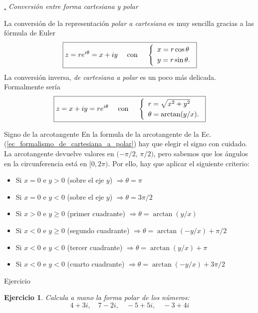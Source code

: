 \documentclass[a4paper,11pt]{book} %
\newtheorem{ejercicio_contador}{Ejercicio}
\newcommand{\Ejercicio}[1]{
		\begin{mybox_gray}{Ejercicio} 
			\begin{ejercicio_contador}
				 #1 
			\end{ejercicio_contador} 
		\end{mybox_gray}
	}
\numberwithin{equation}{chapter}
\def\subsubiContadorIt{\par\addtocounter{subsubsection}{1}\underline{\it\thesubsubsection.}\hskip0.5cm \setcounter{subsubsubsectionIt}{0}}
\newcommand{\SubsubiIt}[1]{
		\subsubiContadorIt \textit{#1}
	}
\newcounter{subsubsubsectionIt}[subsubsection]
\begin{document}
		
			\SubsubiIt{Conversión entre forma cartesiana y polar}

La conversión de la representación \textit{polar a cartesiana} es muy sencilla gracias a las fórmula de Euler
	\begin{equation}
	\boxed{z = r e^{i\theta} = x + i y ~~~\hbox{ con }  ~~~\left\{\begin{array}{l} x=r \cos \theta \\ \rule{0mm}{4mm} y = r\sin \theta . \end{array} \right. }
	\end{equation}
La conversión inversa, \textit{de cartesiana a polar} es un poco más delicada. Formalmente sería
	\begin{equation} \label{ec_formalismo_de_cartesiana_a_polar}
	\boxed{z = x + i y  = r e^{i\theta} ~~~ \hbox{ con } ~~~ \left\{\begin{array}{l} r=\sqrt{x^2+y^2} \\  \rule{0mm}{4mm} \theta = \arctan(y/x) . \end{array} \right.} 
	\end{equation}

	\begin{mybox_blue}{Signo de la arcotangente}
	En la formula de la arcotangente de la Ec. (\ref{ec_formalismo_de_cartesiana_a_polar}) hay que elegir el signo con cuidado. La arcotangente devuelve valores en $(-\pi/2$, $\pi/2)$, pero sabemos que los ángulos en la circunferencia está en  $[0,2\pi)$. Por ello, hay que aplicar el siguiente criterio:
	\begin{itemize}
		\item Si $x=0$ e $y>0$ (sobre el eje $y$) $\Rightarrow \theta = \pi$
		\item Si $x=0$ e $y<0$ (sobre el eje $y$) $ \Rightarrow \theta = 3\pi/2$
		\item Si $x>0$ e $y \geq 0$ (primer cuadrante) $ \Rightarrow \theta = \arctan (y/x)$
		\item Si $x<0$ e $y \geq 0$ (segundo cuadrante) $ \Rightarrow \theta = \arctan (-y/x) + \pi/2$
		\item Si $x<0$ e $y<0$ (tercer cuadrante) $ \Rightarrow \theta = \arctan (y/x) + \pi$
		\item Si $x<0$ e $y<0$ (cuarto cuadrante) $ \Rightarrow \theta = \arctan (-y/x) + 3\pi/2$
	\end{itemize}
	\end{mybox_blue}

	\Ejercicio{Calcula a mano la forma polar de los números: 
	$$
	4 + 3i, \quad 7 - 2i, \quad - 5 + 5i, \quad - 3 + 4i
	$$}
			
\end{document}
